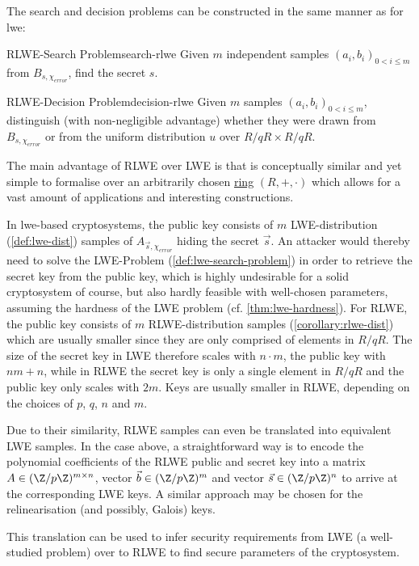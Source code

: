 The search and decision problems can be constructed in the same manner as for \gls{lwe}:

\begin{corollary}{RLWE-Search Problem}{search-rlwe}
  Given $m$ independent samples $(a_i, b_i)_{0 < i \leq m}$ from $B_{s, \chi_{error}}$, find the secret $s$.
\end{corollary}
\begin{corollary}{RLWE-Decision Problem}{decision-rlwe}
  Given $m$ samples $(a_i, b_i)_{0 < i \leq m}$, distinguish (with non-negligible advantage)
  whether they were drawn from $B_{s, \chi_{error}}$ or from the uniform distribution
  $u$ over $R/qR \times R/qR$.
\end{corollary}

The main advantage of RLWE over LWE is that is conceptually similar and yet simple to formalise over an arbitrarily chosen \hyperref[def:ring]{ring} $(R, +, \cdot)$ which allows for a vast amount of applications and interesting constructions.

In \gls{lwe}-based cryptosystems, the public key consists of $m$ LWE-distribution (\cref{def:lwe-dist}) samples of $A_{\vec{s},\chi_{error}}$ hiding the secret $\vec{s}$.
An attacker would thereby need to solve the LWE-Problem (\cref{def:lwe-search-problem}) in order to retrieve the secret key from the public key, which is highly undesirable for a solid cryptosystem of course, but also hardly feasible with well-chosen parameters, assuming the hardness of the LWE problem (cf. \cref{thm:lwe-hardness}).
For RLWE, the public key consists of $m$ RLWE-distribution samples (\cref{corollary:rlwe-dist}) which are usually smaller since they are only comprised of elements in $R/qR$.
The size of the secret key in LWE therefore scales with $n \cdot m$, the public key with $nm + n$, while in RLWE the secret key is only a single element in $R/qR$ and the public key only scales with $2m$.
Keys are usually smaller in RLWE, depending on the choices of $p$, $q$, $n$ and $m$.

Due to their similarity, RLWE samples can even be translated into equivalent LWE samples.
In the case above, a straightforward way is to encode the polynomial coefficients of the RLWE public and secret key into a matrix $A \in (\Z/p\Z)^{m \times n}$, vector $\vec{b} \in (\Z/p\Z)^m$ and vector $\vec{s} \in (\Z/p\Z)^n$ to arrive at the corresponding LWE keys.
A similar approach may be chosen for the relinearisation (and possibly, Galois) keys.

This translation can be used to infer security requirements from LWE (a well-studied problem) over to RLWE to find secure parameters of the cryptosystem.

